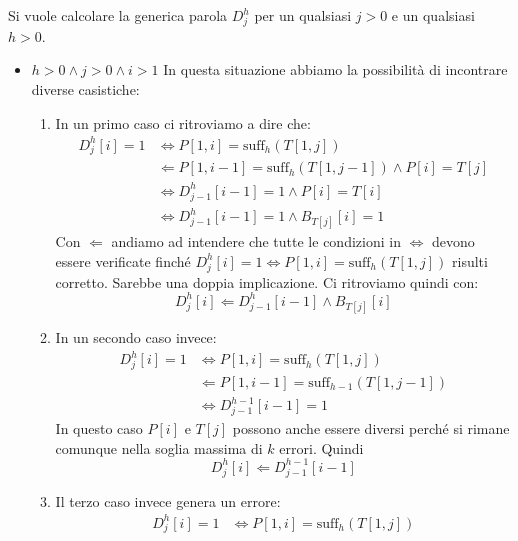 Si vuole calcolare la generica parola $D^h_j$ per un qualsiasi $j>0$ e un qualsiasi $h>0$.
\begin{itemize}
   \item $h>0 \land j>0 \land i >1$
       In questa situazione abbiamo la possibilità di incontrare diverse casistiche:
       \begin{enumerate}
       \item In un primo caso ci ritroviamo a dire che:
           \begin{equation*}
               \begin{split}
                   D^h_j[i] = 1 &\iff P[1, i] = \mbox{suff}_h(T[1, j]) \\
                   & \Leftarrow P[1, i-1] = \mbox{suff}_h(T[1, j-1]) \land P[i] = T[j] \\
                    &\iff D^h_{j-1}[i-1] = 1 \land P[i] = T[i] \\
                    &\iff D^h_{j-1}[i-1] = 1 \land B_{T[j]}[i] = 1
               \end{split}
           \end{equation*}
           Con $\Leftarrow$ andiamo ad intendere che tutte le condizioni in $\iff$ devono essere verificate finché $D^h_j[i] = 1 \iff P[1, i] = \mbox{suff}_h(T[1, j])$ risulti corretto. Sarebbe una doppia implicazione. Ci ritroviamo quindi con:
           \[D^h_j[i] \Leftarrow D^h_{j-1}[i-1] \land B_{T[j]} [i]\]
       \item In un secondo caso invece:
            \begin{equation*}
               \begin{split}
               D^h_j[i] = 1 & \iff P[1, i] = \mbox{suff}_h(T[1, j]) \\
               & \Leftarrow P[1, i-1] = \mbox{suff}_{h-1}(T[1, j-1]) \\
               & \iff D^{h-1}_{j-1}[i-1] = 1
               \end{split}
            \end{equation*}
            In questo caso $P[i]$ e $T[j]$ possono anche essere diversi perché si rimane comunque nella soglia massima di $k$ errori. Quindi \[D^h_j[i] \Leftarrow D^{h-1}_{j-1}[i-1]\]
        \item Il terzo caso invece genera un errore:
        \begin{equation*}
            \begin{split}
                D^h_j[i] = 1 &\iff P[1, i] = \mbox{suff}_h(T[1, j]) \\

\end{split}
\end{equation*}
\end{enumerate}
\end{itemize}
